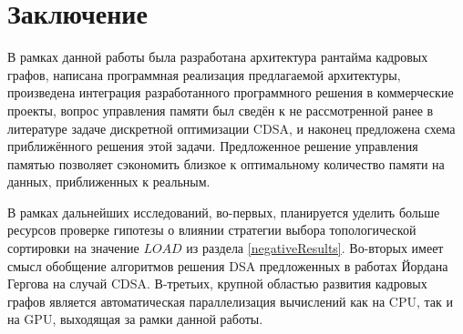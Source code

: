 \section{Заключение}
В рамках данной работы была разработана архитектура рантайма кадровых графов, написана программная реализация предлагаемой архитектуры, произведена интеграция разработанного программного решения в коммерческие проекты, вопрос управления памяти был сведён к не рассмотренной ранее в литературе задаче дискретной оптимизации CDSA, и наконец предложена схема приближённого решения этой задачи.
Предложенное решение управления памятью позволяет сэкономить близкое к оптимальному количество памяти на данных, приближенных к реальным.

В рамках дальнейших исследований, во-первых, планируется уделить больше ресурсов проверке гипотезы о влиянии стратегии выбора топологической сортировки на значение $LOAD$ из раздела \ref{negativeResults}.
Во-вторых имеет смысл обобщение алгоритмов решения DSA предложенных в работах Йордана Гергова \cite{gergov_approximation_1996, gergov_algorithms_1999} на случай CDSA.
В-третьих, крупной областью развития кадровых графов является автоматическая параллелизация вычислений как на CPU, так и на GPU, выходящая за рамки данной работы.

